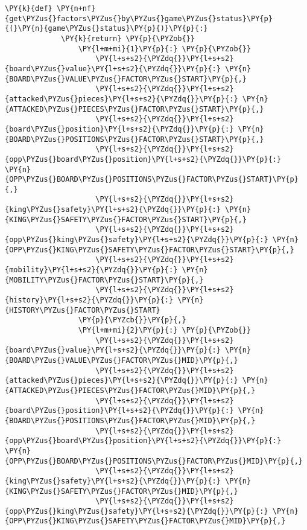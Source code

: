\begin{Verbatim}[commandchars=\\\{\}]
         \PY{k}{def} \PY{n+nf}{get\PYZus{}factors\PYZus{}by\PYZus{}game\PYZus{}status}\PY{p}{(}\PY{n}{game\PYZus{}status}\PY{p}{)}\PY{p}{:}
             \PY{k}{return} \PY{p}{\PYZob{}}
                 \PY{l+m+mi}{1}\PY{p}{:} \PY{p}{\PYZob{}}
                     \PY{l+s+s2}{\PYZdq{}}\PY{l+s+s2}{board\PYZus{}value}\PY{l+s+s2}{\PYZdq{}}\PY{p}{:} \PY{n}{BOARD\PYZus{}VALUE\PYZus{}FACTOR\PYZus{}START}\PY{p}{,}
                     \PY{l+s+s2}{\PYZdq{}}\PY{l+s+s2}{attacked\PYZus{}pieces}\PY{l+s+s2}{\PYZdq{}}\PY{p}{:} \PY{n}{ATTACKED\PYZus{}PIECES\PYZus{}FACTOR\PYZus{}START}\PY{p}{,}
                     \PY{l+s+s2}{\PYZdq{}}\PY{l+s+s2}{board\PYZus{}position}\PY{l+s+s2}{\PYZdq{}}\PY{p}{:} \PY{n}{BOARD\PYZus{}POSITIONS\PYZus{}FACTOR\PYZus{}START}\PY{p}{,}
                     \PY{l+s+s2}{\PYZdq{}}\PY{l+s+s2}{opp\PYZus{}board\PYZus{}position}\PY{l+s+s2}{\PYZdq{}}\PY{p}{:} \PY{n}{OPP\PYZus{}BOARD\PYZus{}POSITIONS\PYZus{}FACTOR\PYZus{}START}\PY{p}{,}
                     \PY{l+s+s2}{\PYZdq{}}\PY{l+s+s2}{king\PYZus{}safety}\PY{l+s+s2}{\PYZdq{}}\PY{p}{:} \PY{n}{KING\PYZus{}SAFETY\PYZus{}FACTOR\PYZus{}START}\PY{p}{,}
                     \PY{l+s+s2}{\PYZdq{}}\PY{l+s+s2}{opp\PYZus{}king\PYZus{}safety}\PY{l+s+s2}{\PYZdq{}}\PY{p}{:} \PY{n}{OPP\PYZus{}KING\PYZus{}SAFETY\PYZus{}FACTOR\PYZus{}START}\PY{p}{,}
                     \PY{l+s+s2}{\PYZdq{}}\PY{l+s+s2}{mobility}\PY{l+s+s2}{\PYZdq{}}\PY{p}{:} \PY{n}{MOBILITY\PYZus{}FACTOR\PYZus{}START}\PY{p}{,}
                     \PY{l+s+s2}{\PYZdq{}}\PY{l+s+s2}{history}\PY{l+s+s2}{\PYZdq{}}\PY{p}{:} \PY{n}{HISTORY\PYZus{}FACTOR\PYZus{}START}
                 \PY{p}{\PYZcb{}}\PY{p}{,}
                 \PY{l+m+mi}{2}\PY{p}{:} \PY{p}{\PYZob{}}
                     \PY{l+s+s2}{\PYZdq{}}\PY{l+s+s2}{board\PYZus{}value}\PY{l+s+s2}{\PYZdq{}}\PY{p}{:} \PY{n}{BOARD\PYZus{}VALUE\PYZus{}FACTOR\PYZus{}MID}\PY{p}{,}
                     \PY{l+s+s2}{\PYZdq{}}\PY{l+s+s2}{attacked\PYZus{}pieces}\PY{l+s+s2}{\PYZdq{}}\PY{p}{:} \PY{n}{ATTACKED\PYZus{}PIECES\PYZus{}FACTOR\PYZus{}MID}\PY{p}{,}
                     \PY{l+s+s2}{\PYZdq{}}\PY{l+s+s2}{board\PYZus{}position}\PY{l+s+s2}{\PYZdq{}}\PY{p}{:} \PY{n}{BOARD\PYZus{}POSITIONS\PYZus{}FACTOR\PYZus{}MID}\PY{p}{,}
                     \PY{l+s+s2}{\PYZdq{}}\PY{l+s+s2}{opp\PYZus{}board\PYZus{}position}\PY{l+s+s2}{\PYZdq{}}\PY{p}{:} \PY{n}{OPP\PYZus{}BOARD\PYZus{}POSITIONS\PYZus{}FACTOR\PYZus{}MID}\PY{p}{,}
                     \PY{l+s+s2}{\PYZdq{}}\PY{l+s+s2}{king\PYZus{}safety}\PY{l+s+s2}{\PYZdq{}}\PY{p}{:} \PY{n}{KING\PYZus{}SAFETY\PYZus{}FACTOR\PYZus{}MID}\PY{p}{,}
                     \PY{l+s+s2}{\PYZdq{}}\PY{l+s+s2}{opp\PYZus{}king\PYZus{}safety}\PY{l+s+s2}{\PYZdq{}}\PY{p}{:} \PY{n}{OPP\PYZus{}KING\PYZus{}SAFETY\PYZus{}FACTOR\PYZus{}MID}\PY{p}{,}

\end{Verbatim}
